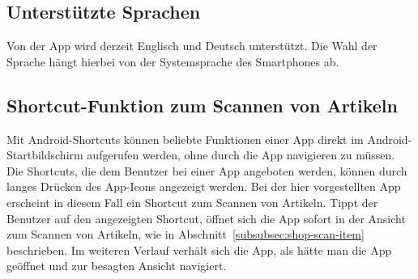 \subsection{Unterstützte Sprachen} \label{subsec:languages}

Von der App wird derzeit Englisch und Deutsch unterstützt.
Die Wahl der Sprache hängt hierbei von der Systemsprache des Smartphones ab.

\subsection{Shortcut-Funktion zum Scannen von Artikeln} \label{subsec:scan-item-shortcut}

Mit Android-Shortcuts können beliebte Funktionen einer App direkt im Android-Startbildschirm aufgerufen werden, ohne durch die App navigieren zu müssen.
Die Shortcuts, die dem Benutzer bei einer App angeboten werden, können durch langes Drücken des App-Icons angezeigt werden.
Bei der hier vorgestellten App erscheint in diesem Fall ein Shortcut zum Scannen von Artikeln.
Tippt der Benutzer auf den angezeigten Shortcut, öffnet sich die App sofort in der Ansicht zum Scannen von Artikeln, wie in Abschnitt~\ref{subsubsec:shop-scan-item} beschrieben.
Im weiteren Verlauf verhält sich die App, als hätte man die App geöffnet und zur besagten Ansicht navigiert.
